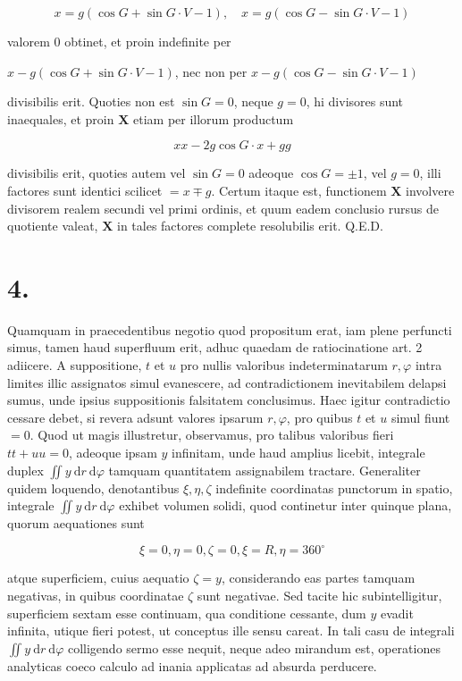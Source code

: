 \documentclass[twoside,12pt, showframe]{memoir}
\begin{document}
\[
x=g(\cos G+\sin G \cdot V-1), \quad x=g(\cos G-\sin G \cdot V-1)
\]

valorem 0 obtinet, et proin indefinite per

\(x-g(\cos G+\sin G \cdot V-1)\), nec non per \(x-g(\cos G-\sin G \cdot V-1)\)

divisibilis erit. Quoties non est \(\sin G=0\), neque \(g=0\), hi divisores sunt inaequales, et proin \(\boldsymbol{X}\) etiam per illorum productum

\[
x x-2 g \cos G \cdot x+g g
\]

divisibilis erit, quoties autem vel \(\sin G=0\) adeoque \(\cos G= \pm 1\), vel \(g=0\), illi factores sunt identici scilicet \(=x \mp g\). Certum itaque est, functionem \(\mathbf{X}\) involvere divisorem realem secundi vel primi ordinis, et quum eadem conclusio rursus de quotiente valeat, \(\boldsymbol{X}\) in tales factores complete resolubilis erit. Q.E.D.

\section*{4.}
Quamquam in praecedentibus negotio quod propositum erat, iam plene perfuncti simus, tamen haud superfluum erit, adhuc quaedam de ratiocinatione art. 2 adiicere. A suppositione, \(t\) et \(u\) pro nullis valoribus indeterminatarum \(r, \varphi\) intra limites illic assignatos simul evanescere, ad contradictionem inevitabilem delapsi sumus, unde ipsius suppositionis falsitatem conclusimus. Haec igitur contradictio cessare debet, si revera adsunt valores ipsarum \(r, \varphi\), pro quibus \(t\) et \(u\) simul fiunt \(=0\). Quod ut magis illustretur, observamus, pro talibus valoribus fieri \(t t+u u=0\), adeoque ipsam \(y\) infinitam, unde haud amplius licebit, integrale duplex \(\iint y \mathrm{~d} r \mathrm{~d} \varphi\) tamquam quantitatem assignabilem tractare. Generaliter quidem loquendo, denotantibus \(\xi, \eta, \zeta\) indefinite coordinatas punctorum in spatio, integrale \(\iint y \mathrm{~d} r \mathrm{~d} \varphi\) exhibet volumen solidi, quod continetur inter quinque plana, quorum aequationes sunt

\[
\xi=0, \eta=0, \zeta=0, \xi=R, \eta=360^{\circ}
\]

atque superficiem, cuius aequatio \(\zeta=y\), considerando eas partes tamquam negativas, in quibus coordinatae \(\zeta\) sunt negativae. Sed tacite hic subintelligitur, superficiem sextam esse continuam, qua conditione cessante, dum \(y\) evadit infinita, utique fieri potest, ut conceptus ille sensu careat. In tali casu de integrali \(\iint y \mathrm{~d} r \mathrm{~d} \varphi\) colligendo sermo esse nequit, neque adeo mirandum est, operationes analyticas coeco calculo ad inania applicatas ad absurda perducere.
\end{document}
